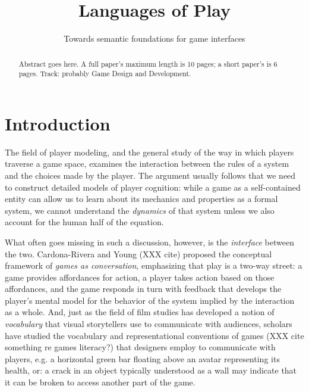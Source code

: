 \documentclass[sigconf]{acmart}
\begin{document}
\title{Languages of Play}
\subtitle{Towards semantic foundations for game interfaces}


% 


\begin{abstract}
Abstract goes here. A full paper's maximum length is 10 pages; a short
paper's is 6 pages. Track: probably Game Design and Development.
\end{abstract}



\maketitle

\section{Introduction}

The field of player modeling, and the general study of the way in which
players traverse a game space, examines the interaction between the rules
of a system and the choices made by the player. The argument usually
follows that we need to construct detailed models of player cognition: 
while a game as a self-contained entity can allow us to learn about its
mechanics and properties as a formal system, we cannot understand the {\em
dynamics} of that system unless we also account for the human half of the
equation.

What often goes missing in such a discussion, however, is the {\em
interface} between the two. Cardona-Rivera and Young (XXX cite) proposed
the conceptual framework of {\em games as conversation}, emphasizing that
play is a two-way street: a game provides affordances for action, a player
takes action based on those affordances, and the game responds in turn with
feedback that develops the player's mental model for the behavior
of the system implied by the interaction as a whole. And, just as the field
of film studies has developed a notion of {\em vocabulary} that visual
storytellers use to communicate with audiences, scholars have studied the
vocabulary and representational conventions of games (XXX cite something re
games literacy?) that designers employ to communicate with players, e.g. a
horizontal green bar floating above an avatar representing its health, or:
a crack in an object typically understood as a wall may indicate that it
can be broken to access another part of the game.
\end{document}
